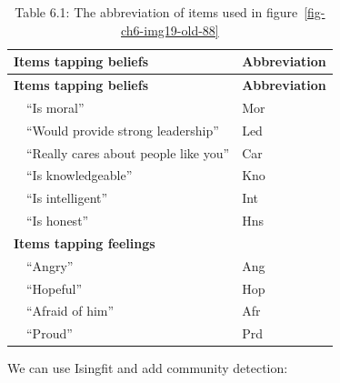 \documentclass[
  a4paper,
  DIV=11,
  numbers=noendperiod,
  oneside]{scrreprt}
\newenvironment{Shaded}{}{}
\newcommand{\AttributeTok}[1]{\textcolor[rgb]{0.84,0.23,0.29}{#1}}
\newcommand{\CommentTok}[1]{\textcolor[rgb]{0.42,0.45,0.49}{#1}}
\newcommand{\ConstantTok}[1]{\textcolor[rgb]{0.00,0.36,0.77}{#1}}
\newcommand{\DecValTok}[1]{\textcolor[rgb]{0.00,0.36,0.77}{#1}}
\newcommand{\FunctionTok}[1]{\textcolor[rgb]{0.44,0.26,0.76}{#1}}
\newcommand{\NormalTok}[1]{\textcolor[rgb]{0.14,0.16,0.18}{#1}}
\newcommand{\OtherTok}[1]{\textcolor[rgb]{0.44,0.26,0.76}{#1}}
\newcommand{\SpecialCharTok}[1]{\textcolor[rgb]{0.00,0.36,0.77}{#1}}
\newcommand{\StringTok}[1]{\textcolor[rgb]{0.01,0.18,0.38}{#1}}
\begin{document}
\begin{longtable}[]{@{}ll@{}}
\caption{Table 6.1: The abbreviation of items used in
figure~\ref{fig-ch6-img19-old-88}}\tabularnewline
\toprule\noalign{}
\textbf{Items tapping beliefs} & \textbf{Abbreviation} \\
\midrule\noalign{}
\endfirsthead
\toprule\noalign{}
\textbf{Items tapping beliefs} & \textbf{Abbreviation} \\
\midrule\noalign{}
\endhead
\bottomrule\noalign{}
\endlastfoot
 ``Is moral'' & Mor \\
 ``Would provide strong leadership'' & Led \\
 ``Really cares about people like you'' & Car \\
 ``Is knowledgeable'' & Kno \\
 ``Is intelligent'' & Int \\
 ``Is honest'' & Hns \\
\textbf{Items tapping feelings} & \\
 ``Angry'' & Ang \\
 ``Hopeful'' & Hop \\
 ``Afraid of him'' & Afr \\
 ``Proud'' & Prd \\
\end{longtable}

We can use Isingfit and add community detection:

\begin{Shaded}
\end{Shaded}
\end{document}
